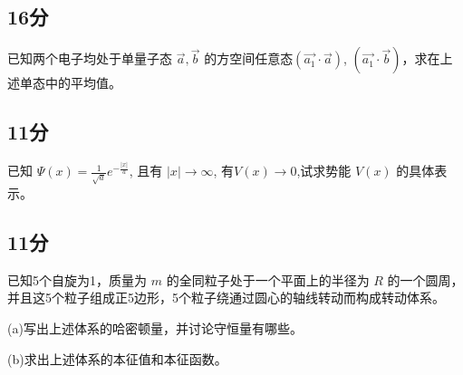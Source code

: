 \subsection{16分}
已知两个电子均处于单量子态 $\vec {a}, \vec{b}$ 的方空间任意态$(\vec{a_1} \cdot \vec{a})$, $(\vec{a_1} \cdot \vec{b})$，求在上述单态中的平均值。

\subsection{11分}
已知 $\Psi(x) = \frac{1}{\sqrt{a}} e^{-\frac{|x|}{a}}$, 且有 $|x| \rightarrow \infty$, 有$V(x)\to 0$,试求势能 $V(x)$ 的具体表示。

\subsection{11分}
已知5个自旋为1，质量为 $m$ 的全同粒子处于一个平面上的半径为 $R$ 的一个圆周，并且这5个粒子组成正5边形，5个粒子绕通过圆心的轴线转动而构成转动体系。

(a)写出上述体系的哈密顿量，并讨论守恒量有哪些。

(b)求出上述体系的本征值和本征函数。